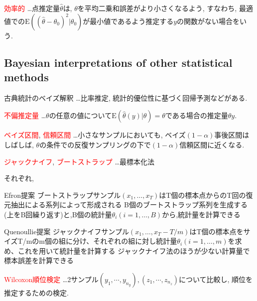 \documentclass[11pt,a4pape,dvipdfmx]{jarticle}
\newcommand{\tcr}[1]{\textcolor{red}{#1}}
\begin{document}
\begin{itembox}[l]{\tcr{効率的}}
…点推定量$\hat{\theta}$は, $\theta$を平均二乗和誤差がより小さくなるよう, すなわち, 最適値での$\text{E}((\hat{\theta}-\theta_0)^2|\theta_0)$が最小値であるよう推定する$y$の関数がない場合をいう.
\end{itembox}



\subsection{Bayesian interpretations of other statistical methods}
\begin{itembox}[l]{古典統計のベイズ解釈}
…比率推定, 統計的優位性に基づく回帰予測などがある.
\end{itembox}


\begin{itembox}[l]{\tcr{不偏推定量}}
…$\theta$の任意の値について$\text{E}(\hat{\theta}(y)|\theta)=\theta$である場合の推定量$\theta y$.
\end{itembox}



\begin{itembox}[l]{\tcr{ベイズ区間}, \tcr{信頼区間}}
…小さなサンプルにおいても, ベイズ$(1-\alpha)$事後区間はしばしば, $\theta$の条件での反復サンプリングの下で$(1-\alpha)$信頼区間に近くなる.
\end{itembox}



\begin{itembox}[l]{\tcr{ジャックナイフ}, \tcr{ブートストラップ}}
…最標本化法
\end{itembox}
それぞれ,

Efron提案
ブートストラップサンプル$(x_1,\dots,x_T)$はT個の標本点からのT回の復元抽出による系列によって形成される
B個のブートストラップ系列を生成する(上をB回繰り返す)と,B個の統計量$\theta_i(i=1,\dots,B)$から,統計量を計算できる

Quenoullie提案
ジャックナイフサンプル$(x_1,\dots,x_T-T/m)$はT個の標本点をサイズT/mのm個の組に分け、それぞれの組に対し統計量$\theta_i(i=1,\dots,m)$を求め、これを用いて統計量を計算する
ジャックナイフ法のほうが少ない計算量で標本誤差を計算できる


\begin{itembox}[l]{\tcr{Wilcoxon順位検定}}
…2サンプル$(y_1,\cdots,y_{n_y}), (z_1,\cdots,z_{n_z})$について比較し, 順位を推定するための検定.
\end{itembox}
\end{document}
